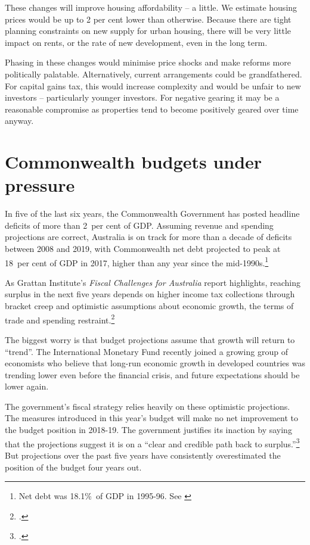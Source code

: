 \documentclass{grattan}\usepackage[]{graphicx}\usepackage[]{color}
\begin{document}
\begin{overview*}[-35pt]
These changes will improve housing affordability -- a little. We estimate housing prices would be up to 2 per cent lower than otherwise. Because there are tight planning constraints on new supply for urban housing, there will be very little impact on rents, or the rate of new development, even in the long term. 

Phasing in these changes would minimise price shocks and make reforms more politically palatable. Alternatively, current arrangements could be grandfathered. For capital gains tax, this would increase complexity and would be unfair to new investors -- particularly younger investors. For negative gearing it may be a reasonable compromise as properties tend to become positively geared over time anyway. 
\end{overview*}
\addtolength{\columnsep}{-\overviewextra}
 
\setcounter{tocdepth}{4}
\contentspage
\chapter{Commonwealth budgets under pressure}
In five of the last six years, the Commonwealth Government has posted headline deficits of more than 2~per cent of GDP.
Assuming revenue and spending projections are correct, Australia is on track for more than a decade of deficits between 2008 and 2019, with Commonwealth net debt projected to peak at 18~per cent of GDP in 2017, higher than any year since the mid-1990s.\footnote{Net debt was 18.1\%\ of GDP in 1995-96. See \textcite[p.~273]{Treasury2014b}}
 
As Grattan Institute's \emph{Fiscal Challenges for Australia} report highlights, reaching surplus in the next five years depends on higher income tax collections through bracket creep and optimistic assumptions about economic growth, the terms of trade and spending restraint.\footcite{DaleyWood2015}
 
The biggest worry is that budget projections assume that growth will return to ``trend''. The International Monetary Fund recently joined a growing group of economists who believe that long-run economic growth in developed countries was trending lower even before the financial crisis, and future expectations should be lower again.
 
 
The government's fiscal strategy relies heavily on these optimistic projections. The measures introduced in this year's budget will make no net improvement to the budget position in 2018-19. The government justifies its inaction by saying that the projections suggest it is on a ``clear and credible path back to surplus.''\footcite{Hockey2015} But projections over the past five years have consistently overestimated the position of the budget four years out.
 
\end{document}
